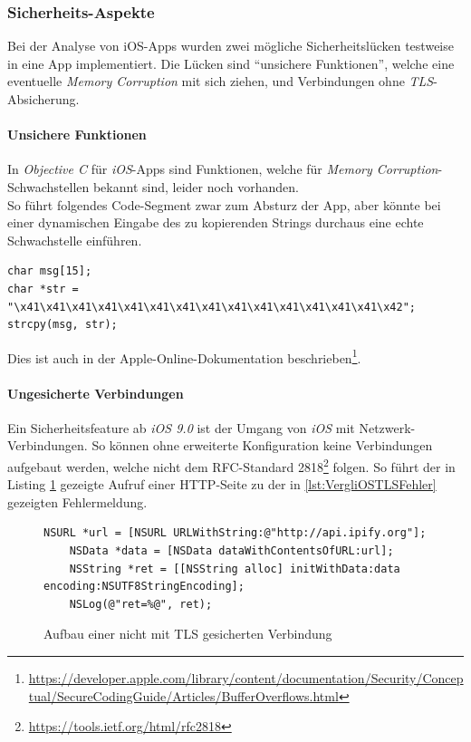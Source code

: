 \subsubsection{Sicherheits-Aspekte}
Bei der Analyse von iOS-Apps wurden zwei mögliche Sicherheitslücken testweise in eine App implementiert. Die Lücken sind "`unsichere Funktionen"', welche eine eventuelle \textit{Memory Corruption} mit sich ziehen, und Verbindungen ohne \textit{TLS}-Absicherung.

\pagebreak
\paragraph{Unsichere Funktionen}
In \textit{Objective C} für \textit{iOS}-Apps sind Funktionen, welche für \textit{Memory Corruption}-Schwachstellen bekannt sind, leider noch vorhanden.\\

So führt folgendes Code-Segment zwar zum Absturz der App, aber könnte bei einer dynamischen Eingabe des zu kopierenden Strings durchaus eine echte Schwachstelle einführen.
\begin{lstlisting}
char msg[15];
char *str = "\x41\x41\x41\x41\x41\x41\x41\x41\x41\x41\x41\x41\x41\x41\x42";
strcpy(msg, str);
\end{lstlisting}

Dies ist auch in der Apple-Online-Dokumentation beschrieben\footnote{\url{https://developer.apple.com/library/content/documentation/Security/Conceptual/SecureCodingGuide/Articles/BufferOverflows.html}}.

\paragraph{Ungesicherte Verbindungen}\label{ref:inseccon}
Ein Sicherheitsfeature ab \textit{iOS 9.0} ist der Umgang von \textit{iOS} mit Netzwerk-Verbindungen. So können ohne erweiterte Konfiguration keine Verbindungen aufgebaut werden, welche nicht dem RFC-Standard 2818\footnote{\url{https://tools.ietf.org/html/rfc2818}} folgen. So führt der in Listing \ref{lst:VergliOSTLSAufbau} gezeigte Aufruf einer HTTP-Seite zu der in \ref{lst:VergliOSTLSFehler} gezeigten Fehlermeldung.\\

\begin{figure}[p]
\begin{lstlisting}
NSURL *url = [NSURL URLWithString:@"http://api.ipify.org"];
    NSData *data = [NSData dataWithContentsOfURL:url];
    NSString *ret = [[NSString alloc] initWithData:data encoding:NSUTF8StringEncoding];
    NSLog(@"ret=%@", ret);
\end{lstlisting} 
\caption{Aufbau einer nicht mit TLS gesicherten Verbindung}
\label{lst:VergliOSTLSAufbau}
\end{figure}

